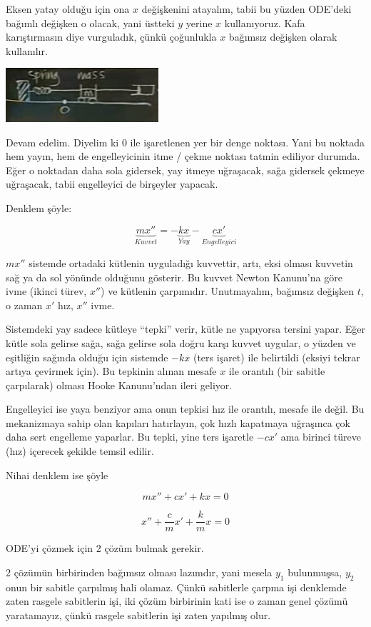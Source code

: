 \documentclass[12pt,fleqn]{article}\usepackage{../../common}
\begin{document}
Eksen yatay olduğu için ona $x$ değişkenini atayalım, tabii bu yüzden ODE'deki
bağımlı değişken o olacak, yani üstteki $y$ yerine $x$ kullanıyoruz. Kafa
karıştırmasın diye vurguladık, çünkü çoğunlukla $x$ bağımsız değişken olarak
kullanılır.

\includegraphics[height=2cm]{9_2.png}

Devam edelim. Diyelim ki 0 ile işaretlenen yer bir denge noktası. Yani bu
noktada hem yayın, hem de engelleyicinin itme / çekme noktası tatmin ediliyor
durumda. Eğer o noktadan daha sola gidersek, yay itmeye uğraşacak, sağa gidersek
çekmeye uğraşacak, tabii engelleyici de birşeyler yapacak.

Denklem şöyle: 

$$
\underbrace{mx''}_{Kuvvet} =
- \underbrace{kx}_{Yay} 
- \underbrace{cx'}_{Engelleyici}
$$

$mx''$ sistemde ortadaki kütlenin uyguladığı kuvvettir, artı, eksi olması
kuvvetin sağ ya da sol yönünde olduğunu gösterir. Bu kuvvet Newton Kanunu'na
göre ivme (ikinci türev, $x''$) ve kütlenin çarpımıdır. Unutmayalım, bağımsız
değişken $t$, o zaman $x'$ hız, $x''$ ivme.

Sistemdeki yay sadece kütleye ``tepki'' verir, kütle ne yapıyorsa tersini
yapar. Eğer kütle sola gelirse sağa, sağa gelirse sola doğru karşı kuvvet
uygular, o yüzden ve eşitliğin sağında olduğu için sistemde $-kx$ (ters işaret)
ile belirtildi (eksiyi tekrar artıya çevirmek için). Bu tepkinin alınan mesafe
$x$ ile orantılı (bir sabitle çarpılarak) olması Hooke Kanunu'ndan ileri
geliyor.

Engelleyici ise yaya benziyor ama onun tepkisi hız ile orantılı, mesafe ile
değil. Bu mekanizmaya sahip olan kapıları hatırlayın, çok hızlı kapatmaya
uğraşınca çok daha sert engelleme yaparlar. Bu tepki, yine ters işaretle $-cx'$
ama birinci türeve (hız) içerecek şekilde temsil edilir.

Nihai denklem ise şöyle

$$ mx'' + cx' + kx = 0 $$

$$ x'' + \frac{c}{m}x' + \frac{k}{m}x = 0 $$

ODE'yi çözmek için 2 çözüm bulmak gerekir. 

2 çözümün birbirinden bağımsız olması lazımdır, yani mesela $y_1$ bulunmuşsa,
$y_2$ onun bir sabitle çarpılmış hali olamaz. Çünkü sabitlerle çarpma işi
denklemde zaten rasgele sabitlerin işi, iki çözüm birbirinin kati ise o zaman
genel çözümü yaratamayız, çünkü rasgele sabitlerin işi zaten yapılmış olur.
\end{document}
